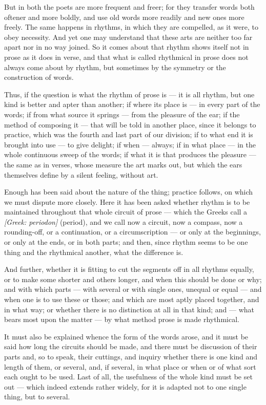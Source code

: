  But in both the poets are more frequent and freer; for they transfer words both oftener and more boldly, and use old words more readily and new ones more freely. The same happens in rhythms, in which they are compelled, as it were, to obey necessity. And yet one may understand that these arts are neither too far apart nor in no way joined. So it comes about that rhythm shows itself not in prose as it does in verse, and that what is called rhythmical in prose does not always come about by rhythm, but sometimes by the symmetry or the construction of words.

 Thus, if the question is what the rhythm of prose is — it is all rhythm, but one kind is better and apter than another; if where its place is — in every part of the words; if from what source it springs — from the pleasure of the ear; if the method of composing it — that will be told in another place, since it belongs to practice, which was the fourth and last part of our division; if to what end it is brought into use — to give delight; if when — always; if in what place — in the whole continuous sweep of the words; if what it is that produces the pleasure — the same as in verses, whose measure the art marks out, but which the ears themselves define by a silent feeling, without art.

 Enough has been said about the nature of the thing; practice follows, on which we must dispute more closely. Here it has been asked whether rhythm is to be maintained throughout that whole circuit of prose — which the Greeks call a \textit{[Greek: periodon]} (period), and we call now a circuit, now a compass, now a rounding-off, or a continuation, or a circumscription — or only at the beginnings, or only at the ends, or in both parts; and then, since rhythm seems to be one thing and the rhythmical another, what the difference is.

 And further, whether it is fitting to cut the segments off in all rhythms equally, or to make some shorter and others longer, and when this should be done or why; and with which parts — with several or with single ones, unequal or equal — and when one is to use these or those; and which are most aptly placed together, and in what way; or whether there is no distinction at all in that kind; and — what bears most upon the matter — by what method prose is made rhythmical.

 It must also be explained whence the form of the words arose, and it must be said how long the circuits should be made, and there must be discussion of their parts and, so to speak, their cuttings, and inquiry whether there is one kind and length of them, or several, and, if several, in what place or when or of what sort each ought to be used. Last of all, the usefulness of the whole kind must be set out — which indeed extends rather widely, for it is adapted not to one single thing, but to several.

